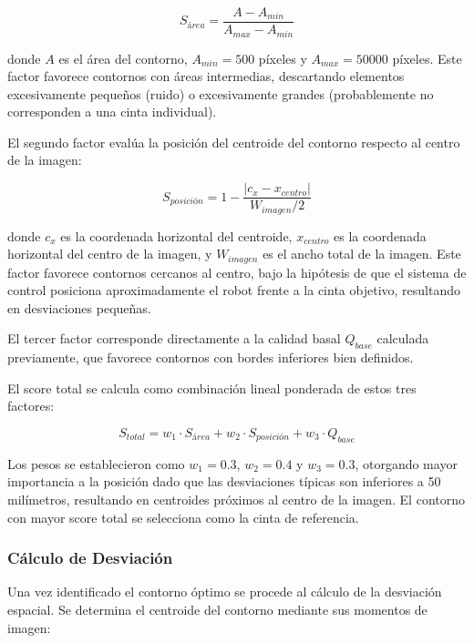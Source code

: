 \begin{equation}
S_{área} = \frac{A - A_{min}}{A_{max} - A_{min}}
\end{equation}

donde $A$ es el área del contorno, $A_{min} = 500$ píxeles y $A_{max} = 50000$ píxeles. Este factor favorece contornos con áreas intermedias, descartando elementos excesivamente pequeños (ruido) o excesivamente grandes (probablemente no corresponden a una cinta individual).

El segundo factor evalúa la posición del centroide del contorno respecto al centro de la imagen:

\begin{equation}
S_{posición} = 1 - \frac{|c_x - x_{centro}|}{W_{imagen}/2}
\end{equation}

donde $c_x$ es la coordenada horizontal del centroide, $x_{centro}$ es la coordenada horizontal del centro de la imagen, y $W_{imagen}$ es el ancho total de la imagen. Este factor favorece contornos cercanos al centro, bajo la hipótesis de que el sistema de control posiciona aproximadamente el robot frente a la cinta objetivo, resultando en desviaciones pequeñas.

El tercer factor corresponde directamente a la calidad basal $Q_{base}$ calculada previamente, que favorece contornos con bordes inferiores bien definidos.

El score total se calcula como combinación lineal ponderada de estos tres factores:

\begin{equation}
S_{total} = w_1 \cdot S_{área} + w_2 \cdot S_{posición} + w_3 \cdot Q_{base}
\end{equation}

Los pesos se establecieron como $w_1 = 0.3$, $w_2 = 0.4$ y $w_3 = 0.3$, otorgando mayor importancia a la posición dado que las desviaciones típicas son inferiores a 50 milímetros, resultando en centroides próximos al centro de la imagen. El contorno con mayor score total se selecciona como la cinta de referencia.

\subsubsection{Cálculo de Desviación}

Una vez identificado el contorno óptimo se procede al cálculo de la desviación espacial. Se determina el centroide del contorno mediante sus momentos de imagen:

